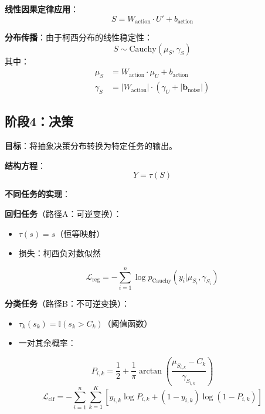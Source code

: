 \documentclass[conference]{IEEEtran}
\newcommand{\cauchy}{\text{Cauchy}}
\newcommand{\indicator}{\mathbb{I}}
\begin{document}
\begin{CJK}{UTF8}{gbsn}
\textbf{线性因果定律应用}：
\begin{equation}
S = W_{\text{action}} \cdot U' + b_{\text{action}}
\end{equation}

\textbf{分布传播}：由于柯西分布的线性稳定性：
\begin{equation}
S \sim \cauchy(\mu_S, \gamma_S)
\end{equation}
其中：
\begin{align}
\mu_S &= W_{\text{action}} \cdot \mu_U + b_{\text{action}} \\
\gamma_S &= |W_{\text{action}}| \cdot (\gamma_U + |\mathbf{b}_{\text{noise}}|)
\end{align}

\subsection{阶段4：决策}

\textbf{目标}：将抽象决策分布转换为特定任务的输出。

\textbf{结构方程}：
\begin{equation}
Y = \tau(S)
\end{equation}

\textbf{不同任务的实现}：

\textbf{回归任务}（路径A：可逆变换）：
\begin{itemize}
\item $\tau(s) = s$（恒等映射）
\item 损失：柯西负对数似然
\end{itemize}
\begin{equation}
\mathcal{L}_{\text{reg}} = -\sum_{i=1}^n \log p_{\cauchy}(y_i | \mu_{S_i}, \gamma_{S_i})
\end{equation}

\textbf{分类任务}（路径B：不可逆变换）：
\begin{itemize}
\item $\tau_k(s_k) = \indicator(s_k > C_k)$（阈值函数）  
\item 一对其余概率：
\end{itemize}
\begin{equation}
P_{i,k} = \frac{1}{2} + \frac{1}{\pi} \arctan\left(\frac{\mu_{S_{i,k}} - C_k}{\gamma_{S_{i,k}}}\right)
\end{equation}
\begin{equation}
\mathcal{L}_{\text{clf}} = -\sum_{i=1}^n \sum_{k=1}^K [y_{i,k} \log P_{i,k} + (1-y_{i,k}) \log(1-P_{i,k})]
\end{equation}


\end{CJK}
\end{document}
